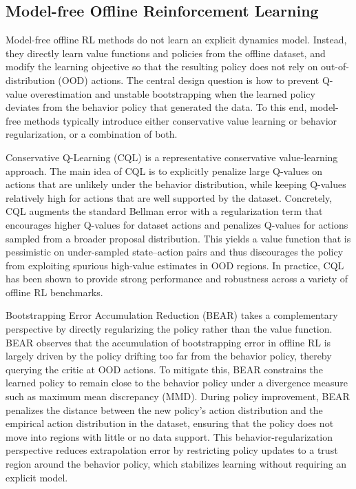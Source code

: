 \documentclass[master,english,final]{kaist-ucs}
\begin{document}
\subsection{Model-free Offline Reinforcement Learning}
Model-free offline RL methods do not learn an explicit dynamics model. Instead, they directly learn value functions and policies from the offline dataset, and modify the learning objective so that the resulting policy does not rely on out-of-distribution (OOD) actions. The central design question is how to prevent Q-value overestimation and unstable bootstrapping when the learned policy deviates from the behavior policy that generated the data. To this end, model-free methods typically introduce either conservative value learning or behavior regularization, or a combination of both.

Conservative Q-Learning (CQL)\cite{kumar2020conservative} is a representative conservative value-learning approach. The main idea of CQL is to explicitly penalize large Q-values on actions that are unlikely under the behavior distribution, while keeping Q-values relatively high for actions that are well supported by the dataset. Concretely, CQL augments the standard Bellman error with a regularization term that encourages higher Q-values for dataset actions and penalizes Q-values for actions sampled from a broader proposal distribution. This yields a value function that is pessimistic on under-sampled state–action pairs and thus discourages the policy from exploiting spurious high-value estimates in OOD regions. In practice, CQL has been shown to provide strong performance and robustness across a variety of offline RL benchmarks.

Bootstrapping Error Accumulation Reduction (BEAR)\cite{kumar2019stabilizing} takes a complementary perspective by directly regularizing the policy rather than the value function. BEAR observes that the accumulation of bootstrapping error in offline RL is largely driven by the policy drifting too far from the behavior policy, thereby querying the critic at OOD actions. To mitigate this, BEAR constrains the learned policy to remain close to the behavior policy under a divergence measure such as maximum mean discrepancy (MMD). During policy improvement, BEAR penalizes the distance between the new policy’s action distribution and the empirical action distribution in the dataset, ensuring that the policy does not move into regions with little or no data support. This behavior-regularization perspective reduces extrapolation error by restricting policy updates to a trust region around the behavior policy, which stabilizes learning without requiring an explicit model.
\end{document}
